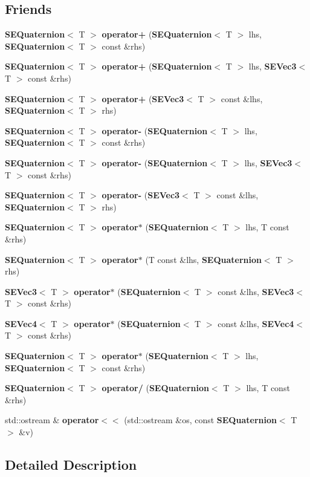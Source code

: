 \subsection*{Friends}
\begin{DoxyCompactItemize}
\item 
{\bf S\+E\+Quaternion}$<$ T $>$ {\bf operator+} ({\bf S\+E\+Quaternion}$<$ T $>$ lhs, {\bf S\+E\+Quaternion}$<$ T $>$ const \&rhs)
\item 
{\bf S\+E\+Quaternion}$<$ T $>$ {\bf operator+} ({\bf S\+E\+Quaternion}$<$ T $>$ lhs, {\bf S\+E\+Vec3}$<$ T $>$ const \&rhs)
\item 
{\bf S\+E\+Quaternion}$<$ T $>$ {\bf operator+} ({\bf S\+E\+Vec3}$<$ T $>$ const \&lhs, {\bf S\+E\+Quaternion}$<$ T $>$ rhs)
\item 
{\bf S\+E\+Quaternion}$<$ T $>$ {\bf operator-\/} ({\bf S\+E\+Quaternion}$<$ T $>$ lhs, {\bf S\+E\+Quaternion}$<$ T $>$ const \&rhs)
\item 
{\bf S\+E\+Quaternion}$<$ T $>$ {\bf operator-\/} ({\bf S\+E\+Quaternion}$<$ T $>$ lhs, {\bf S\+E\+Vec3}$<$ T $>$ const \&rhs)
\item 
{\bf S\+E\+Quaternion}$<$ T $>$ {\bf operator-\/} ({\bf S\+E\+Vec3}$<$ T $>$ const \&lhs, {\bf S\+E\+Quaternion}$<$ T $>$ rhs)
\item 
{\bf S\+E\+Quaternion}$<$ T $>$ {\bf operator$\ast$} ({\bf S\+E\+Quaternion}$<$ T $>$ lhs, T const \&rhs)
\item 
{\bf S\+E\+Quaternion}$<$ T $>$ {\bf operator$\ast$} (T const \&lhs, {\bf S\+E\+Quaternion}$<$ T $>$ rhs)
\item 
{\bf S\+E\+Vec3}$<$ T $>$ {\bf operator$\ast$} ({\bf S\+E\+Quaternion}$<$ T $>$ const \&lhs, {\bf S\+E\+Vec3}$<$ T $>$ const \&rhs)
\item 
{\bf S\+E\+Vec4}$<$ T $>$ {\bf operator$\ast$} ({\bf S\+E\+Quaternion}$<$ T $>$ const \&lhs, {\bf S\+E\+Vec4}$<$ T $>$ const \&rhs)
\item 
{\bf S\+E\+Quaternion}$<$ T $>$ {\bf operator$\ast$} ({\bf S\+E\+Quaternion}$<$ T $>$ lhs, {\bf S\+E\+Quaternion}$<$ T $>$ const \&rhs)
\item 
{\bf S\+E\+Quaternion}$<$ T $>$ {\bf operator/} ({\bf S\+E\+Quaternion}$<$ T $>$ lhs, T const \&rhs)
\item 
std\+::ostream \& {\bf operator$<$$<$} (std\+::ostream \&os, const {\bf S\+E\+Quaternion}$<$ T $>$ \&v)
\end{DoxyCompactItemize}


\subsection{Detailed Description}
